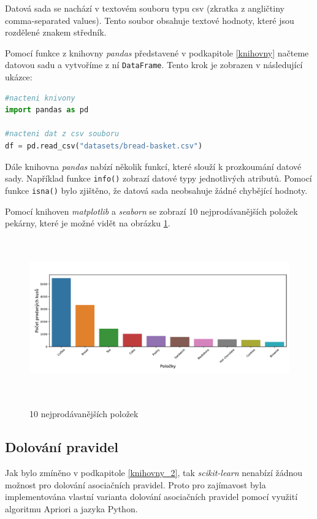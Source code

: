 Datová sada se nachází v textovém souboru typu csv (zkratka z angličtiny comma-separated values). Tento soubor obsahuje textové hodnoty, které jsou rozdělené znakem středník. 

Pomocí funkce z knihovny \textit{pandas} představené v podkapitole \ref{knihovny} načteme datovou sadu a vytvoříme z ní \verb|DataFrame|. Tento krok je zobrazen v následující ukázce:

\begin{mdframed}
\begin{lstlisting}[language=Python]
#nacteni knivony
import pandas as pd

#nacteni dat z csv souboru
df = pd.read_csv("datasets/bread-basket.csv")

\end{lstlisting}   
\end{mdframed}

Dále knihovna \textit{pandas} nabízí několik funkcí, které slouží k prozkoumání datové sady. Například funkce \verb|info()| zobrazí datové typy jednotlivých atributů. Pomocí funkce \verb|isna()| bylo zjištěno, že datová sada neobsahuje žádné chybějící hodnoty. 

Pomocí knihoven \textit{matplotlib} a \textit{seaborn} se zobrazí 10 nejprodávanějších položek pekárny, které je možné vidět na obrázku \ref{top10}. 

\begin{figure}[h]\centering
  \centering
  \includegraphics[width=\linewidth,height=2.7in]{obrazky/top10.pdf}\\[1pt]
  \caption{10 nejprodávanějších položek}
  \label{top10}
\end{figure}

\subsection*{Dolování pravidel}
Jak bylo zmíněno v podkapitole \ref{knihovny_2}, tak \textit{scikit-learn} nenabízí žádnou možnost pro dolování asociačních pravidel. Proto pro zajímavost byla implementována vlastní varianta dolování asociačních pravidel pomocí využití algoritmu Apriori a jazyka Python.

